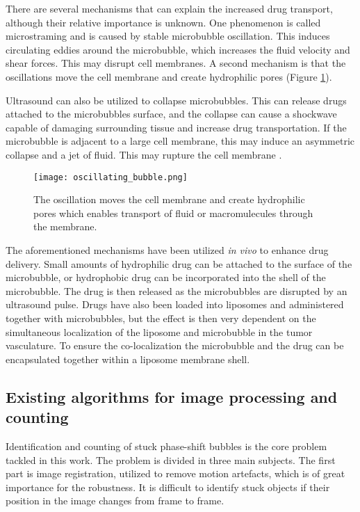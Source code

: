There are several mechanisms that can explain the increased drug transport, although their relative importance is unknown. One phenomenon is called microstraming and is caused by stable microbubble oscillation. This induces circulating eddies around the microbubble, which increases the fluid velocity and shear forces\cite{Nyborg1982}. This may disrupt cell membranes\cite{Marmottant2003}. A second mechanism is that the oscillations move the cell membrane and create hydrophilic pores (Figure \ref{Fig:oscillating_bubble})\cite{VanWamel2006a}.

Ultrasound can also be utilized to collapse microbubbles. This can release drugs attached to the microbubbles surface, and the collapse can cause a shockwave capable of damaging surrounding tissue and increase drug transportation. If the microbubble is adjacent to a large cell membrane, this may induce an asymmetric collapse and a jet of fluid. This may rupture the cell membrane \cite{Pitt2004}.  

\begin{figure}[h]
  \centering
  \texttt{[image: oscillating\_bubble.png]}
  \caption{The oscillation moves the cell membrane and create hydrophilic pores which enables transport of fluid or macromulecules through the membrane\cite{VanWamel2006a}.}
  \label{Fig:oscillating_bubble}
\end{figure}


The aforementioned mechanisms have been utilized \textit{in vivo} to enhance drug delivery. Small amounts of hydrophilic drug can be attached to the surface of the microbubble, or hydrophobic drug can be incorporated into the shell of the microbubble. The drug is then released as the microbubbles are disrupted by an ultrasound pulse\cite{Liu2006}. Drugs have also been loaded into liposomes and administered together with microbubbles, but the effect is then very dependent on the simultaneous localization of the liposome and microbubble in the tumor vasculature. To ensure the co-localization the microbubble and the drug can be encapsulated together within a liposome membrane shell\cite{Ibsen2011}.


  

\clearpage
\subsection{Existing algorithms for image processing and counting}
\label{existing algorithms}
Identification and counting of stuck phase-shift bubbles is the core problem tackled in this work. The problem is divided in three main subjects. The first part is image registration, utilized to remove motion artefacts, which is of great importance for the robustness. It is difficult to identify stuck objects if their position in the image changes from frame to frame.

